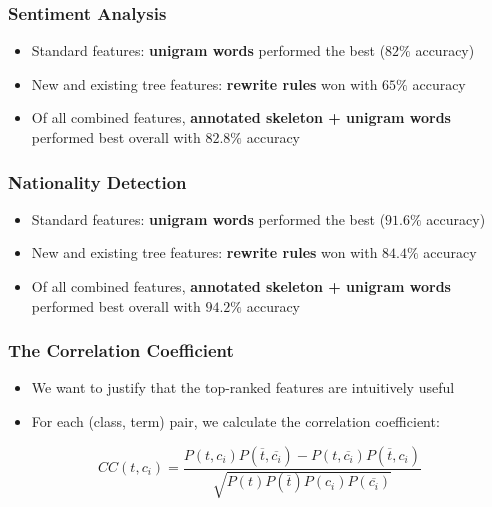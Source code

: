 \documentclass[handouti]{beamer}
\begin{document}
\begin{frame}
    \frametitle{Sentiment Analysis}
    \begin{itemize}
        \itemsep1.5em
        \item Standard features: \textbf{unigram words} performed the best
            ($82\%$ accuracy)

        \item New and existing tree features: \textbf{rewrite rules} won with
            $65\%$ accuracy

        \item Of all combined features, \textbf{annotated skeleton + unigram
            words} performed best overall with $82.8\%$ accuracy
    \end{itemize}
\end{frame}

\begin{frame}
    \frametitle{Nationality Detection}
    \begin{itemize}
        \itemsep1.5em
        \item Standard features: \textbf{unigram words} performed the best
            ($91.6\%$ accuracy)

        \item New and existing tree features: \textbf{rewrite rules} won with
            $84.4\%$ accuracy

        \item Of all combined features, \textbf{annotated skeleton + unigram
            words} performed best overall with $94.2\%$ accuracy
    \end{itemize}
\end{frame}

\begin{frame}
    \frametitle{The Correlation Coefficient}

    \begin{itemize}
        \item We want to justify that the top-ranked features are intuitively
            useful
        \item For each (class, term) pair, we calculate the correlation
            coefficient:
    \end{itemize}

    \vspace{.2in}

$$CC(t, c_i) = \frac{P(t,c_i)P(\overline{t},\overline{c_i}) - 
    P(t,\overline{c_i})P(\overline{t},c_i)}
    {\sqrt{P(t)P(\overline{t})P(c_i)P(\overline{c_i})}} $$ \\
\end{frame}
\end{document}
